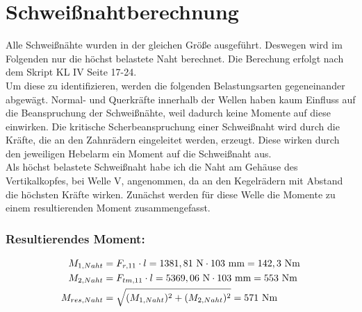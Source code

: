\newpage
\section{Schweißnahtberechnung}
Alle Schweißnähte wurden in der gleichen Größe ausgeführt. Deswegen wird im Folgenden nur die höchst belastete Naht berechnet. Die Berechung erfolgt nach dem Skript KL IV  Seite 17-24.\\
Um diese zu identifizieren, werden die folgenden Belastungsarten gegeneinander abgewägt. Normal- und Querkräfte innerhalb der Wellen haben kaum Einfluss auf die Beanspruchung der Schweißnähte, weil dadurch keine Momente auf diese einwirken. Die kritische Scherbeanspruchung einer Schweißnaht wird durch die Kräfte, die an den Zahnrädern eingeleitet werden, erzeugt. Diese wirken durch den jeweiligen Hebelarm ein Moment auf die Schweißnaht aus.\\
Als höchst belastete Schweißnaht habe ich die Naht am Gehäuse des Vertikalkopfes, bei Welle V, angenommen, da an den Kegelrädern mit Abstand die höchsten Kräfte wirken. Zunächst werden für diese Welle die Momente zu einem resultierenden Moment zusammengefasst.
\subsubsection{Resultierendes Moment:}
\begin{align*}
	M_{1,Naht} &= F_{r,11} \cdot l = 1381,81 \text{ N} \cdot 103 \text{ mm} = 142,3\text{ Nm} \\
	M_{2,Naht} &= F_{tm,11} \cdot l = 5369,06 \text{ N} \cdot 103 \text{ mm} = 553 \text{ Nm} \\
	M_{res,Naht} &= \sqrt{(M_{1,Naht})^2 + (M_{2,Naht})^2} = 571 \text{ Nm} 
\end{align*}
